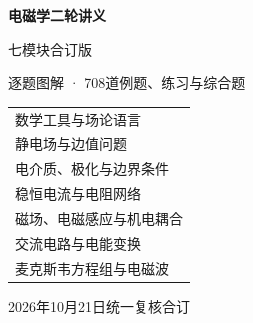\begin{titlepage}
\centering
\vspace*{.10\textheight}
{\sffamily\bfseries\Huge\color{Heading} 电磁学二轮讲义\par}
\vspace{1cm}
{\sffamily\LARGE 七模块合订版\par}
\vspace{.6cm}
{\large 逐题图解 · 708道例题、练习与综合题\par}
\vspace{1.3cm}
\begin{tabular}{l}
数学工具与场论语言\\[8pt]
静电场与边值问题\\[8pt]
电介质、极化与边界条件\\[8pt]
稳恒电流与电阻网络\\[8pt]
磁场、电磁感应与机电耦合\\[8pt]
交流电路与电能变换\\[8pt]
麦克斯韦方程组与电磁波
\end{tabular}
\vfill
2026年10月21日统一复核合订
\end{titlepage}
